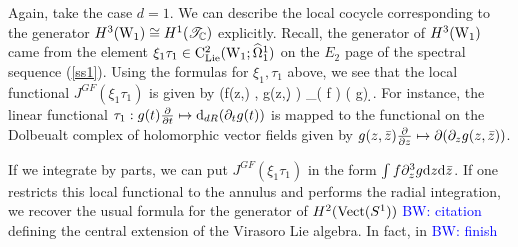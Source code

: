 \documentclass[10pt]{amsart}
\def\brian{\textcolor{blue}{BW: }\textcolor{blue}}
\begin{document}
\begin{eg}
Again, take the case $d=1$. 
We can describe the local cocycle corresponding to the generator $H^3({\rm W}_1) \cong H^1(\mathscr T_{\mathbb C})$ explicitly. 
Recall, the generator of $H^3({\rm W}_1)$ came from the element $\xi_1 \tau_1 \in {\rm C}_{{\rm Lie}}^2({\rm W}_1 ; \widehat{\Omega}^1_1)$ on the $E_2$ page of the spectral sequence (\ref{ss1}). 
Using the formulas for $\xi_1,\tau_1$ above, we see that the local functional $J^{GF}(\xi_1 \tau_1)$ is given by
\ben
\left(f(z,\zbar) , g(z,\zbar)\d \zbar {} \right) \mapsto \int_\CC \left( f \right) \partial \left( g\right) \d \zbar .
\een 
For instance, the linear functional $\tau_1 : g(t) \frac{\partial}{\partial t} \mapsto {\rm d}_{dR} (\partial_t g(t))$ is mapped to the functional on the Dolbeualt complex of holomorphic vector fields given by $g(z,\Bar{z}) \frac{\partial}{\partial z} \mapsto \partial (\partial_z g(z,\Bar{z}))$. 

If we integrate by parts, we can put $J^{GF}(\xi_1 \tau_1)$ in the form $\int f \partial^3_z g {\rm d} z {\rm d} \Bar{z}$. 
If one restricts this local functional to the annulus and performs the radial integration, we recover the usual formula for the generator of $H^2({\rm Vect}(S^1))$ \brian{citation} defining the central extension of the Virasoro Lie algebra. 
In fact, in \cite{BWVir} \brian{finish}
\end{eg}
\end{document}
